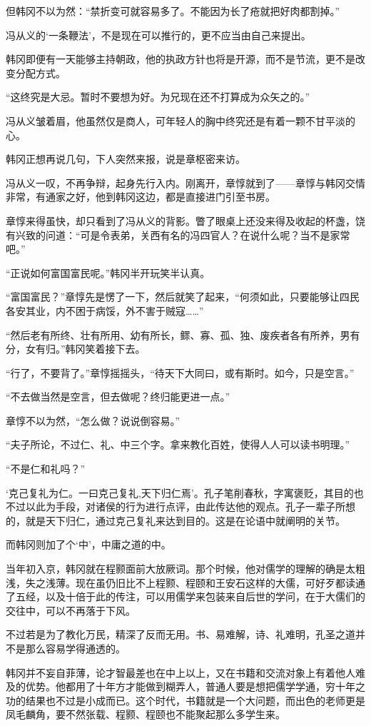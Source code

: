 但韩冈不以为然：“禁折变可就容易多了。不能因为长了疮就把好肉都割掉。”

冯从义的‘一条鞭法’，不是现在可以推行的，更不应当由自己来提出。

韩冈即便有一天能够主持朝政，他的执政方针也将是开源，而不是节流，更不是改变分配方式。

“这终究是大忌。暂时不要想为好。为兄现在还不打算成为众矢之的。”

冯从义皱着眉，他虽然仅是商人，可年轻人的胸中终究还是有着一颗不甘平淡的心。

韩冈正想再说几句，下人突然来报，说是章枢密来访。

冯从义一叹，不再争辩，起身先行入内。刚离开，章惇就到了——章惇与韩冈交情非常，有通家之好，他到韩冈这边，都是直接进门引至书房。

章惇来得虽快，却只看到了冯从义的背影。瞥了眼桌上还没来得及收起的杯盏，饶有兴致的问道：“可是令表弟，关西有名的冯四官人？在说什么呢？当不是家常吧。”

“正说如何富国富民呢。”韩冈半开玩笑半认真。

“富国富民？”章惇先是愣了一下，然后就笑了起来，“何须如此，只要能够让四民各安其业，内不困于病馁，外不害于贼寇……”

“然后老有所终、壮有所用、幼有所长，鳏、寡、孤、独、废疾者各有所养，男有分，女有归。”韩冈笑着接下去。

“行了，不要背了。”章惇摇摇头，“待天下大同曰，或有斯时。如今，只是空言。”

“不去做当然是空言，但去做呢？终归能更进一点。”

章惇不以为然，“怎么做？说说倒容易。”

“夫子所论，不过仁、礼、中三个字。拿来教化百姓，使得人人可以读书明理。”

“不是仁和礼吗？”

‘克己复礼为仁。一曰克己复礼,天下归仁焉’。孔子笔削春秋，字寓褒贬，其目的也不过以此为手段，对诸侯的行为进行点评，由此传达他的观点。孔子一辈子所想的，就是天下归仁，通过克己复礼来达到目的。这是在论语中就阐明的关节。

而韩冈则加了个‘中’，中庸之道的中。

当年初入京，韩冈就在程颢面前大放厥词。那个时候，他对儒学的理解的确是太粗浅，失之浅薄。现在虽仍旧比不上程颢、程颐和王安石这样的大儒，可好歹都读通了五经，以及十倍于此的传注，可以用儒学来包装来自后世的学问，在于大儒们的交往中，可以不再落于下风。

不过若是为了教化万民，精深了反而无用。书、易难解，诗、礼难明，孔圣之道并不是那么容易学得通透的。

韩冈并不妄自菲薄，论才智最差也在中上以上，又在书籍和交流对象上有着他人难及的优势。他都用了十年方才能做到糊弄人，普通人要是想把儒学学通，穷十年之功的结果也不过是小成而已。这个时代，书籍就是一个大问题，而出色的老师更是凤毛麟角，要不然张载、程颢、程颐也不能聚起那么多学生来。

